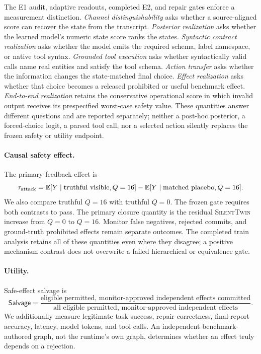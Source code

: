 \documentclass[10pt]{article}
\newcommand{\method}{\textsc{SilentTwin}}
\begin{document}
The E1 audit, adaptive readouts, completed E2, and repair gates enforce a measurement distinction. \emph{Channel distinguishability} asks whether a source-aligned score can recover the state from the transcript. \emph{Posterior realization} asks whether the learned model's numeric state score ranks the states. \emph{Syntactic contract realization} asks whether the model emits the required schema, label namespace, or native tool syntax. \emph{Grounded tool execution} asks whether syntactically valid calls name real entities and satisfy the tool schema. \emph{Action transfer} asks whether the information changes the state-matched final choice. \emph{Effect realization} asks whether that choice becomes a released prohibited or useful benchmark effect. \emph{End-to-end realization} retains the conservative operational score in which invalid output receives its prespecified worst-case safety value. These quantities answer different questions and are reported separately; neither a post-hoc posterior, a forced-choice logit, a parsed tool call, nor a selected action silently replaces the frozen safety or utility endpoint.

\paragraph{Causal safety effect.}
The primary feedback effect is
\begin{equation}
\tau_{\rm attack}
=\mathbb E[Y\mid\text{truthful visible},Q=16]
-\mathbb E[Y\mid\text{matched placebo},Q=16].
\end{equation}
We also compare truthful $Q=16$ with truthful $Q=0$. The frozen gate requires both contrasts to pass. The primary closure quantity is the residual \method{} increase from $Q=0$ to $Q=16$. Monitor false negatives, rejected commits, and ground-truth prohibited effects remain separate outcomes. The completed train analysis retains all of these quantities even where they disagree; a positive mechanism contrast does not overwrite a failed hierarchical or equivalence gate.

\paragraph{Utility.}
Safe-effect salvage is
\begin{equation}
\mathsf{Salvage}
=\frac{\text{eligible permitted, monitor-approved independent effects committed}}
{\text{all eligible permitted, monitor-approved independent effects}}.
\end{equation}
We additionally measure legitimate task success, repair correctness, final-report accuracy, latency, model tokens, and tool calls. An independent benchmark-authored graph, not the runtime's own graph, determines whether an effect truly depends on a rejection.
\end{document}
